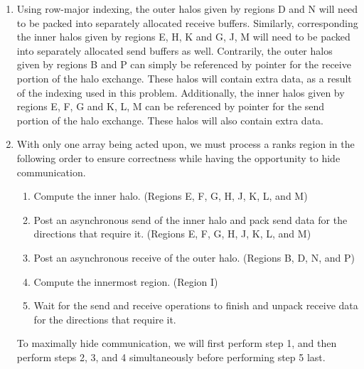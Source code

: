 \documentclass[11pt]{article}
\begin{document}
\begin{enumerate}[leftmargin=0.9in]
\begin{enumerate}[leftmargin=0.3in]
       \item Using row-major indexing, the outer halos given by regions D and N will need to be packed into separately allocated receive buffers. Similarly, corresponding the inner halos given by regions E, H, K and G, J, M will need to be packed into separately allocated send buffers as well. Contrarily, the outer halos given by regions B and P can simply be referenced by pointer for the receive portion of the halo exchange. These halos will contain extra data, as a result of the indexing used in this problem. Additionally, the inner halos given by regions E, F, G and K, L, M can be referenced by pointer for the send portion of the halo exchange. These halos will also contain extra data.
       
       \item With only one array being acted upon, we must process a ranks region in the following order to ensure correctness while having the opportunity to hide communication.
           \begin{enumerate}
               \item Compute the inner halo. (Regions E, F, G, H, J, K, L, and M)
               \item Post an asynchronous send of the inner halo and pack send data for the directions that require it. (Regions E, F, G, H, J, K, L, and M)
               \item Post an asynchronous receive of the outer halo. (Regions B, D, N, and P)
               \item Compute the innermost region. (Region I)
               \item Wait for the send and receive operations to finish and unpack receive data for the directions that require it.
           \end{enumerate}
           To maximally hide communication, we will first perform step 1, and then perform steps 2, 3, and 4 simultaneously before performing step 5 last.
   \end{enumerate}

\end{enumerate} %
\end{document}
